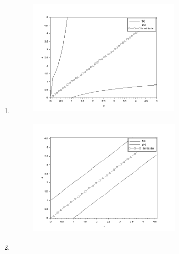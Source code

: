 \documentclass[12pt]{article}
\begin{document}
\begin{enumerate}

\par


\vspace{\baselineskip}

\vspace{\baselineskip}

\vspace{\baselineskip}

\vspace{\baselineskip}
	\item \tab \tab 
\vspace{\baselineskip}


\begin{figure}[H]
	\begin{Center}
		\includegraphics[width=2.9in,height=2.26in]{./media/image15.png}
	\end{Center}
\end{figure}



\par




\begin{figure}[H]
	\begin{Center}
		\includegraphics[width=2.91in,height=2.24in]{./media/image16.png}
	\end{Center}
\end{figure}



	\item  
\end{enumerate}\par
\end{document}
